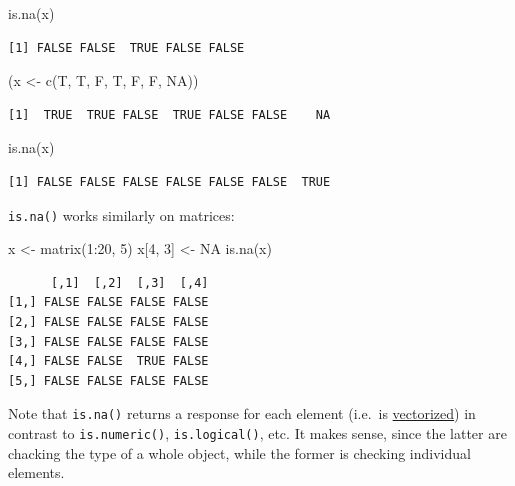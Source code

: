\documentclass[
]{book}
\newenvironment{Shaded}{\begin{snugshade}}{\end{snugshade}}
\newcommand{\ConstantTok}[1]{\textcolor[rgb]{0.00,0.00,0.00}{#1}}
\newcommand{\DecValTok}[1]{\textcolor[rgb]{0.00,0.00,0.81}{#1}}
\newcommand{\FunctionTok}[1]{\textcolor[rgb]{0.00,0.00,0.00}{#1}}
\newcommand{\NormalTok}[1]{#1}
\newcommand{\OtherTok}[1]{\textcolor[rgb]{0.56,0.35,0.01}{#1}}
\newcommand{\SpecialCharTok}[1]{\textcolor[rgb]{0.00,0.00,0.00}{#1}}
\begin{document}
\begin{Shaded}
\begin{Highlighting}[]
\FunctionTok{is.na}\NormalTok{(x)}
\end{Highlighting}
\end{Shaded}

\begin{verbatim}
[1] FALSE FALSE  TRUE FALSE FALSE
\end{verbatim}

\begin{Shaded}
\begin{Highlighting}[]
\NormalTok{(x }\OtherTok{\textless{}{-}} \FunctionTok{c}\NormalTok{(T, T, F, T, F, F, }\ConstantTok{NA}\NormalTok{))}
\end{Highlighting}
\end{Shaded}

\begin{verbatim}
[1]  TRUE  TRUE FALSE  TRUE FALSE FALSE    NA
\end{verbatim}

\begin{Shaded}
\begin{Highlighting}[]
\FunctionTok{is.na}\NormalTok{(x)}
\end{Highlighting}
\end{Shaded}

\begin{verbatim}
[1] FALSE FALSE FALSE FALSE FALSE FALSE  TRUE
\end{verbatim}

\texttt{is.na()} works similarly on matrices:

\begin{Shaded}
\begin{Highlighting}[]
\NormalTok{x }\OtherTok{\textless{}{-}} \FunctionTok{matrix}\NormalTok{(}\DecValTok{1}\SpecialCharTok{:}\DecValTok{20}\NormalTok{, }\DecValTok{5}\NormalTok{)}
\NormalTok{x[}\DecValTok{4}\NormalTok{, }\DecValTok{3}\NormalTok{] }\OtherTok{\textless{}{-}} \ConstantTok{NA}
\FunctionTok{is.na}\NormalTok{(x)}
\end{Highlighting}
\end{Shaded}

\begin{verbatim}
      [,1]  [,2]  [,3]  [,4]
[1,] FALSE FALSE FALSE FALSE
[2,] FALSE FALSE FALSE FALSE
[3,] FALSE FALSE FALSE FALSE
[4,] FALSE FALSE  TRUE FALSE
[5,] FALSE FALSE FALSE FALSE
\end{verbatim}

\begin{rmdnote}
Note that \texttt{is.na()} returns a response for each element (i.e.~is
\protect\hyperlink{vectorization}{vectorized}) in contrast to
\texttt{is.numeric()}, \texttt{is.logical()}, etc. It makes sense, since
the latter are chacking the type of a whole object, while the former is
checking individual elements.
\end{rmdnote}
\end{document}
